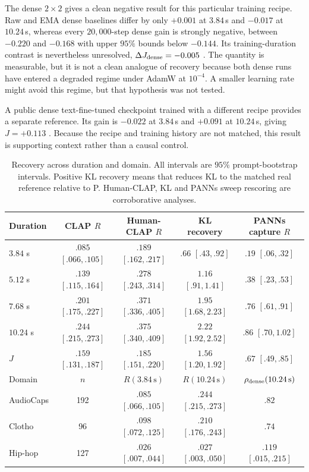 The dense $2\times2$ gives a clean negative result for this particular training recipe. Raw and EMA dense baselines differ by only $+0.001$  at $3.84$\,s and $-0.017$  at $10.24$\,s, whereas every $20{,}000$-step dense gain is strongly negative, between $-0.220$ and $-0.168$ with upper $95\%$ bounds below $-0.144$. Its training-duration contrast is nevertheless unresolved, $\Delta J_{\rm dense}=-0.005$ . The quantity is measurable, but it is not a clean analogue of recovery because both dense runs have entered a degraded regime under AdamW at $10^{-4}$. A smaller learning rate might avoid this regime, but that hypothesis was not tested.

A public dense text-fine-tuned checkpoint trained with a different recipe provides a separate reference. Its gain is $-0.022$  at $3.84$\,s and $+0.091$  at $10.24$\,s, giving $J=+0.113$ . Because the recipe and training history are not matched, this result is supporting context rather than a causal control.

\begin{table}[t]
\centering
\caption{Recovery across duration and domain. All intervals are $95\%$ prompt-bootstrap intervals. Positive KL recovery means that \PFT{} reduces KL to the matched real reference relative to P. Human-CLAP, KL and PANNs sweep rescoring are corroborative analyses.}
\label{tab:evidence}
\setlength{\tabcolsep}{4.0pt}
\begin{tabular}{@{}lcccc@{}}
\toprule
Duration & CLAP $R$ & Human-CLAP $R$ & KL recovery & PANNs capture $R$ \\
\midrule
$3.84$ s & $.085$ $[.066,.105]$ & $.189$ $[.162,.217]$ & $.66$ $[.43,.92]$ & $.19$ $[.06,.32]$ \\
$5.12$ s & $.139$ $[.115,.164]$ & $.278$ $[.243,.314]$ & $1.16$ $[.91,1.41]$ & $.38$ $[.23,.53]$ \\
$7.68$ s & $.201$ $[.175,.227]$ & $.371$ $[.336,.405]$ & $1.95$ $[1.68,2.23]$ & $.76$ $[.61,.91]$ \\
$10.24$ s & $.244$ $[.215,.273]$ & $.375$ $[.340,.409]$ & $2.22$ $[1.92,2.52]$ & $.86$ $[.70,1.02]$ \\
$J$ & $.159$ $[.131,.187]$ & $.185$ $[.151,.220]$ & $1.56$ $[1.20,1.92]$ & $.67$ $[.49,.85]$ \\
\midrule
Domain & $n$ & $R(3.84\,\mathrm{s})$ & $R(10.24\,\mathrm{s})$ & $\rho_{\rm dense}(10.24\,\mathrm{s})$ \\
\midrule
AudioCaps & 192 & $.085$ $[.066,.105]$ & $.244$ $[.215,.273]$ & $.82$ \\
Clotho & 96 & $.098$ $[.072,.125]$ & $.210$ $[.176,.243]$ & $.74$ \\
Hip-hop & 127 & $.026$ $[.007,.044]$ & $.027$ $[.003,.050]$ & $.119$ $[.015,.215]$ \\
\bottomrule
\end{tabular}
\end{table}

